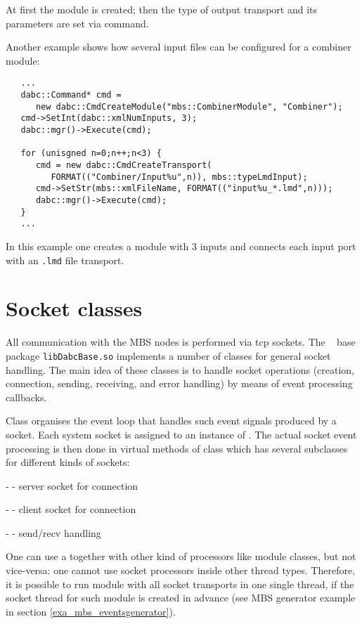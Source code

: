 At first the module is created; then the type of
output transport and its parameters are set via command.        
       
Another example shows how several input files can be configured 
for a combiner module:
   
\begin{small}
\begin{verbatim}
   ...
   dabc::Command* cmd = 
      new dabc::CmdCreateModule("mbs::CombinerModule", "Combiner");
   cmd->SetInt(dabc::xmlNumInputs, 3);
   dabc::mgr()->Execute(cmd);
   
   for (unisgned n=0;n++;n<3) {
      cmd = new dabc::CmdCreateTransport(
         FORMAT(("Combiner/Input%u",n)), mbs::typeLmdInput);
      cmd->SetStr(mbs::xmlFileName, FORMAT(("input%u_*.lmd",n)));
      dabc::mgr()->Execute(cmd);
   }   
   ...
\end{verbatim}
\end{small}

In this example one creates  a module with 3 inputs and connects each input port 
with an {\tt *.lmd} file transport.


\section{Socket classes}

All communication with the MBS nodes is performed via tcp sockets. 
The \dabc~  base package {\tt libDabcBase.so} implements a number
of classes for general socket handling. The
main idea of these classes is to handle socket operations (creation, connection, sending, receiving, and error handling) by means of event processing callbacks. 

Class  organises the event loop
that handles such event signals produced by a socket.
Each system socket is assigned to an instance of . 
The actual socket event processing is then done in virtual methods
of class  which has several subclasses for different 
kinds of sockets: 
\bbul
\item  -  - server socket for connection  
\item  -  - client socket for connection  
\item  -  - send/recv handling  
\ebul

One can use a  together with other kind of processors
like module classes, but not vice-versa: one cannot use socket processors inside other
thread types. Therefore, it is possible to run module with all 
socket transports in one single thread, if the socket thread for such module is created in
advance (see MBS generator example in section \ref{exa_mbs_eventsgenerator}).
  

